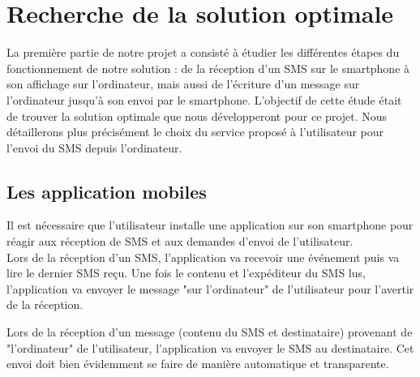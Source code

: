 \cleardoublepage



\chapter{Recherche de la solution optimale}

La première partie de notre projet a consisté à étudier les différentes étapes du fonctionnement de notre solution : de la réception d'un SMS sur le smartphone à son affichage sur l'ordinateur, mais aussi de l'écriture d'un message sur l'ordinateur jusqu'à son envoi par le smartphone.
L'objectif de cette étude était de trouver la solution optimale que nous développeront pour ce projet.
Nous détaillerons plus précisément le choix du service proposé à l'utilisateur pour l'envoi du SMS depuis l'ordinateur.






\section{Les application mobiles}

Il est nécessaire que l'utilisateur installe une application sur son smartphone pour réagir aux réception de SMS et aux demandes d'envoi de l'utilisateur.
\\


Lors de la réception d'un SMS, l'application va recevoir une événement puis va lire le dernier SMS reçu.
Une fois le contenu et l'expéditeur du SMS lus, l'application va envoyer le message "sur l'ordinateur" de l'utilisateur pour l'avertir de la réception.

Lors de la réception d'un message (contenu du SMS et destinataire) provenant de "l'ordinateur" de l'utilisateur, l'application va envoyer le SMS au destinataire.
Cet envoi doit bien évidemment se faire de manière automatique et transparente.

